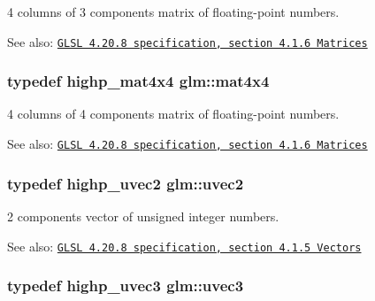 4 columns of 3 components matrix of floating-point numbers.

\begin{Desc}
\item[See also:]\href{http://www.opengl.org/registry/doc/GLSLangSpec.4.20.8.pdf}{\tt GLSL 4.20.8 specification, section 4.1.6 Matrices} \end{Desc}
\hypertarget{group__core__types_g63e3ee9447ed593484140a9368e738ec}{
\subsubsection[mat4x4]{\setlength{\rightskip}{0pt plus 5cm}typedef highp\_\-mat4x4 {\bf glm::mat4x4}}}
\label{group__core__types_g63e3ee9447ed593484140a9368e738ec}


4 columns of 4 components matrix of floating-point numbers.

\begin{Desc}
\item[See also:]\href{http://www.opengl.org/registry/doc/GLSLangSpec.4.20.8.pdf}{\tt GLSL 4.20.8 specification, section 4.1.6 Matrices} \end{Desc}
\hypertarget{group__core__types_gfd2041b45eff671aa8899d2c2835eee9}{
\subsubsection[uvec2]{\setlength{\rightskip}{0pt plus 5cm}typedef highp\_\-uvec2 {\bf glm::uvec2}}}
\label{group__core__types_gfd2041b45eff671aa8899d2c2835eee9}


2 components vector of unsigned integer numbers.

\begin{Desc}
\item[See also:]\href{http://www.opengl.org/registry/doc/GLSLangSpec.4.20.8.pdf}{\tt GLSL 4.20.8 specification, section 4.1.5 Vectors} \end{Desc}
\hypertarget{group__core__types_gc4ba593917841b859ba1683b8b52b8fa}{
\subsubsection[uvec3]{\setlength{\rightskip}{0pt plus 5cm}typedef highp\_\-uvec3 {\bf glm::uvec3}}}
\label{group__core__types_gc4ba593917841b859ba1683b8b52b8fa}


